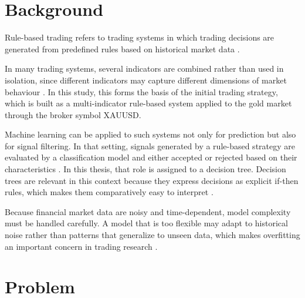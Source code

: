 \section{Background}

Rule-based trading refers to trading systems in which trading decisions are generated from predefined rules based on historical market data \citep{ozturk2016heuristic}.

In many trading systems, several indicators are combined rather than used in isolation, since different indicators may capture different dimensions of market behaviour \citep{sukma2025enhancing}. In this study, this forms the basis of the initial trading strategy, which is built as a multi-indicator rule-based system applied to the gold market through the broker symbol XAUUSD.

Machine learning can be applied to such systems not only for prediction but also for signal filtering. In that setting, signals generated by a rule-based strategy are evaluated by a classification model and either accepted or rejected based on their characteristics \citep{wu2006decisiontree}. In this thesis, that role is assigned to a decision tree. Decision trees are relevant in this context because they express decisions as explicit if-then rules, which makes them comparatively easy to interpret \citep{nugroho2014decision}.

Because financial market data are noisy and time-dependent, model complexity must be handled carefully. A model that is too flexible may adapt to historical noise rather than patterns that generalize to unseen data, which makes overfitting an important concern in trading research \citep{dietterich1995overfitting}. 

\section{Problem}

